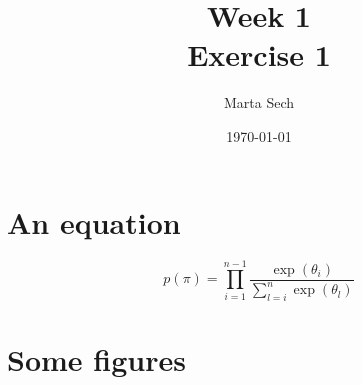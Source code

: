 \documentclass[10pt, fullpage, a4paper, titlepage]{article}
\title{Week 1\\ \small Exercise 1}
\author{Marta Sech}
\date{\today}
\begin{document}
\maketitle
\newpage

\section{An equation}
\begin{equation}
p(\pi) = \prod_{i=1}^{n-1}  \frac{\exp(\theta_{i})}{\sum_{l=i}^{n} \exp(\theta_{l})} 
\end{equation}

\newpage
\section{Some figures}
\begin{figure}[h]
	\begin{center}
\end{center}
\end{figure}
\end{document}
